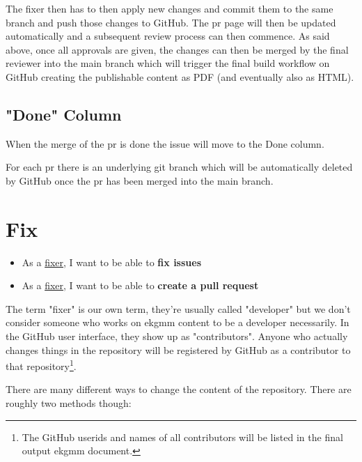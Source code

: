 The fixer then has to then apply new changes and commit 
them to the same branch and push those changes to GitHub. 
The \gls{pr} page will then be updated automatically and a subsequent 
review process can then commence.
As said above, once all approvals are given, 
the changes can then be merged by the final reviewer 
into the main branch which will trigger the final build 
workflow on GitHub creating the publishable content as 
PDF (and eventually also as HTML).

\subsection{"Done" Column}
\label{subsec:ekg-mm-process-done-column}

When the merge of the \gls{pr} is done the issue will move to 
the Done column. 

For each \gls{pr} there is an underlying git branch which 
will be automatically deleted by GitHub once the \gls{pr} 
has been merged into the main branch.

\section{Fix}
\label{sec:ekg-mm-process-fix}

\begin{tcolorbox}[colback=secondary!5,colframe=secondary!80,title=\textbf{User Stories}]
    \begin{itemize}[leftmargin=1em]
        \item As a \underline{fixer}, I want to be able to \textbf{fix issues}
        \item As a \underline{fixer}, I want to be able to \textbf{create a pull request}
    \end{itemize}
\end{tcolorbox}

The term "fixer" is our own term, they’re usually called "developer" but 
we don’t consider someone who works on \gls{ekgmm} content to be a developer necessarily.
In the GitHub user interface, they show up as "contributors".
Anyone who actually changes things in the repository will be registered by GitHub as 
a contributor to that repository\footnote{The GitHub userids and names of all 
contributors will be listed in the final output \gls{ekgmm} document.}.

There are many different ways to change the content of the repository. 
There are roughly two methods though:

